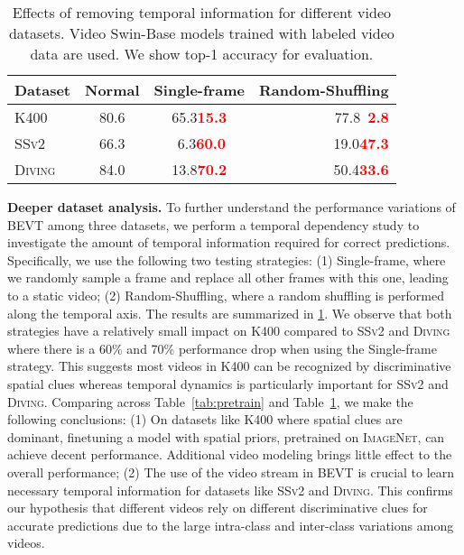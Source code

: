 \documentclass[10pt,twocolumn,letterpaper]{article}
\makeatletter
\newcommand*{\system}{BEVT\@\xspace}
\newcommand{\ssv}{{\scshape SSv2}\xspace}
\newcommand{\diving}{{\scshape Diving\-48}\xspace}
\newcommand{\kn}{{\scshape K400}\xspace}
\newcommand{\inet}{{\scshape ImageNet}\xspace}
\newcommand{\Drop}[1]{\textcolor{red}{\xspace\small{\bf #1}}}
\newcommand{\ra}[1]{\renewcommand{\arraystretch}{#1}}
\makeatother
\begin{document}
\begin{table}[t]
  \centering
  \setlength{\tabcolsep}{0pt} \ra{1.0}
  \begin{tabular*}{\linewidth}{@{\extracolsep{\fill}}lccr@{}}
    \toprule
    Dataset & Normal & Single-frame & Random-Shuffling \\
    \midrule
    \kn & 80.6 & 65.3\Drop{15.3} & 77.8\Drop{\,\,\,2.8} \\
    \ssv & 66.3 & \,\,6.3\Drop{60.0} & \,\,19.0\Drop{47.3} \\
    \diving & 84.0 & 13.8\Drop{70.2} & 50.4\Drop{33.6} \\
    \bottomrule
  \end{tabular*}
  \caption{Effects of removing temporal information for different video datasets. Video Swin-Base models trained with labeled video data are used. We show top-1 accuracy for evaluation.}
  \label{tab:tepmporal_analysis}
\end{table}

\vspace{0.05in}
\noindent\textbf{Deeper dataset analysis.} To further understand the performance variations of \system among three datasets, we perform a temporal dependency study to investigate the amount of temporal information required for correct predictions. Specifically, we use the following two testing strategies: (1) Single-frame, where we randomly sample a frame and replace all other frames with this one, leading to a static video; (2) Random-Shuffling, where a random shuffling is performed along the temporal axis. The results are summarized in \ref{tab:tepmporal_analysis}. We observe that both strategies have a relatively small impact on \kn compared to \ssv and \diving where there is a 60\% and 70\% performance drop when using the Single-frame strategy. This suggests most videos in \kn can be recognized by discriminative spatial clues whereas temporal dynamics is particularly important for \ssv and \diving. Comparing across Table~\ref{tab:pretrain} and Table~\ref{tab:tepmporal_analysis}, we make the following conclusions: (1) On datasets like \kn where spatial clues are dominant, finetuning a model with spatial priors, \eg pretrained on \inet, can achieve decent performance. Additional video modeling brings little effect to the overall performance; (2) The use of the video stream in \system is crucial to learn necessary temporal information for datasets like \ssv and \diving. This confirms our hypothesis that different videos rely on different discriminative clues for accurate predictions due to the large intra-class and inter-class variations among videos.
\end{document}
